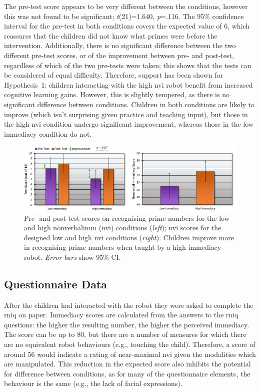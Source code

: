 The pre-test score appears to be very different between the conditions, however this was not found to be significant; \textit{t}(21)=1.640, \textit{p}=.116. The 95\% confidence interval for the pre-test in both conditions covers the expected value of 6, which reassures that the children did not know what primes were before the intervention. Additionally, there is no significant difference between the two different pre-test scores, or of the improvement between pre- and post-test, regardless of which of the two pre-tests were taken; this shows that the tests can be considered of equal difficulty. Therefore, support has been shown for Hypothesis~1: children interacting with the high \acrshort{nvi} robot benefit from increased cognitive \gls{learning} gains. However, this is slightly tempered, as there is no significant difference between conditions. Children in both conditions are likely to improve (which isn't surprising given practice and teaching input), but those in the high \acrshort{nvi} condition undergo significant improvement, whereas those in the low immediacy condition do not.

\begin{figure}[t!]
    \centering
    \includegraphics[width=1.0\textwidth]{images/ch8_graphs.pdf}
    \caption{Pre- and post-test scores on recognising prime numbers for the low and high \gls{nonverbalimm} (\acrshort{nvi}) conditions (\textit{left}); \acrshort{nvi} scores for the designed low and high \acrshort{nvi} conditions (\textit{right}). Children improve more in recognising prime numbers when taught by a high immediacy robot. \textit{Error bars} show 95\% CI.}
    \label{fig:ch8_graphs}
\end{figure}

\subsection{Questionnaire Data}
After the children had interacted with the robot they were asked to complete the \acrshort{rniq} on paper. Immediacy scores are calculated from the answers to the \acrshort{rniq} questions: the higher the resulting number, the higher the perceived immediacy. The score can be up to 80, but there are a number of measures for which there are no equivalent robot behaviours (e.g., touching the child). Therefore, a score of around 56 would indicate a rating of near-maximal \acrshort{nvi} given the modalities which are manipulated. This reduction in the expected score also inhibits the potential for difference between conditions, as for many of the questionnaire elements, the behaviour is the same (e.g., the lack of facial expressions).

